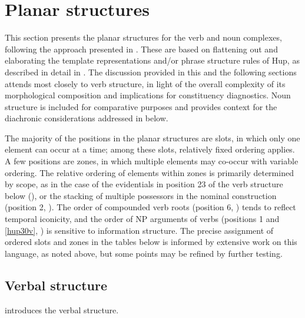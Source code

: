 \documentclass[output=paper]{langscibook}
\begin{document}
\section{Planar structures}
\label{sec:hup:key:3}

This section presents the planar structures for the verb and noun complexes, following the approach presented in \citet{Tallman2021}. These are based on flattening out and elaborating the template representations and/or phrase structure rules of Hup, as described in detail in \citet{Epps2008}. The discussion provided in this and the following sections attends most closely to verb structure, in light of the overall complexity of its morphological composition and implications for constituency diagnostics. Noun structure is included for comparative purposes and provides context for the diachronic considerations addressed in  below.

The majority of the positions in the planar structures are slots, in which only one element can occur at a time; among these slots, relatively fixed ordering applies. A few positions are zones, in which multiple elements may co-occur with variable ordering. The relative ordering of elements within zones is primarily determined by scope, as in the case of the evidentials in position 23 of the verb structure below (), or the stacking of multiple possessors in the nominal construction (position 2, ). The order of compounded verb roots (position 6, ) tends to reflect temporal iconicity, and the order of NP arguments of verbs (positions 1 and \ref{hup30v}, ) is sensitive to information structure. The precise assignment of ordered slots and zones in the tables below is informed by extensive work on this language, as noted above, but some points may be refined by further testing.

\subsection{Verbal structure} \label{sec:hup:key:3.1} %

 introduces the verbal structure. 
\end{document}
